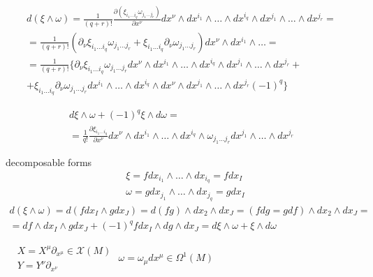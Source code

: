 \documentclass{book}
\begin{document}
\[
\begin{gathered}
  d(\xi \wedge \omega) = \frac{1}{ (q+r)!} \frac{ \partial ( \xi_{i_1 \dots i_q} \omega_{j_1 \dots j_r} )}{ \partial x^{\nu} }dx^{\nu} \wedge dx^{i_1} \wedge \dots \wedge dx^{i_q} \wedge dx^{j_1} \wedge \dots \wedge dx^{j_r} = \\ 
    = \frac{1}{(q+r)!} ( \partial_{\nu} \xi_{i_1 \dots i_q} \omega_{j_1 \dots j_r} + \xi_{i_1 \dots i_q} \partial_{\nu} \omega_{j_1 \dots j_r} ) dx^{\nu} \wedge dx^{i_1} \wedge \dots = \\
    = \frac{1}{ (q+r)!} \lbrace \partial_{\nu} \xi_{i_1 \dots i_q} \omega_{j_1 \dots j_r} dx^{\nu} \wedge dx^{i_1} \wedge \dots \wedge dx^{i_q} \wedge dx^{j_1} \wedge \dots \wedge dx^{j_r} + \\
    + \xi_{i_1 \dots i_q} \partial_{\nu} \omega_{j_1 \dots j_r} dx^{i_1} \wedge \dots \wedge dx^{i_q} \wedge dx^{\nu} \wedge dx^{j_1} \wedge \dots \wedge dx^{j_r} (-1)^q \rbrace 
\end{gathered}
\]

\[
\begin{gathered}
  d\xi \wedge \omega + (-1)^q \xi \wedge d\omega = \\
  = \frac{1}{q!} \frac{ \partial \xi_{i_1 \dots i_q} }{ \partial x^{\nu} } dx^{\nu} \wedge dx^{i_1} \wedge \dots \wedge dx^{i_q} \wedge \omega_{j_1 \dots j_r} dx^{j_1} \wedge \dots \wedge dx^{j_r} 
\end{gathered}
\]

decomposable forms 
\[
\begin{aligned}
  & \xi = f dx_{i_1} \wedge \dots \wedge dx_{i_q} = fdx_I \\ 
  & \omega = gdx_{j_1} \wedge \dots \wedge dx_{j_q} = gdx_I
\end{aligned}
\]
\[
\begin{gathered}
  d(\xi \wedge \omega) = d(fdx_I \wedge g dx_J) = d(fg) \wedge dx_2 \wedge dx_J = (fdg = gdf ) \wedge dx_2 \wedge dx_J = \\
  = df \wedge dx_I \wedge g dx_J + (-1)^q fdx_I \wedge dg \wedge dx_J = d\xi \wedge \omega + \xi \wedge d\omega
\end{gathered}
\]

$\begin{aligned}
  & X = X^{\mu} \partial_{x^{\mu }} \in \mathcal{X}{(M)} \\ 
  & Y = Y^{\nu} \partial_{x^{\nu }}\end{aligned}$ \quad \quad \quad $\omega = \omega_{\mu} dx^{\mu} \in \Omega^1(M)$
\end{document}
